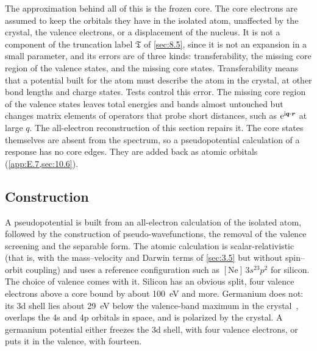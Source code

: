 The approximation behind all of this is the frozen core. The core electrons are assumed to keep the orbitals they have in the isolated atom, unaffected by the crystal, the valence electrons, or a displacement of the nucleus. It is not a component of the truncation label $\mathfrak{T}$ of \cref{sec:8.5}, since it is not an expansion in a small parameter, and its errors are of three kinds: transferability, the missing core region of the valence states, and the missing core states. Transferability means that a potential built for the atom must describe the atom in the crystal, at other bond lengths and charge states. Tests control this error. The missing core region of the valence states leaves total energies and bands almost untouched but changes matrix elements of operators that probe short distances, such as $\mathrm{e}^{\mathrm{i}\bm{q}\cdot\bm{r}}$ at large $q$. The all-electron reconstruction of this section repairs it. The core states themselves are absent from the spectrum, so a pseudopotential calculation of a response has no core edges. They are added back as atomic orbitals (\cref{app:E.7,sec:10.6}).

\subsection{Construction}

A pseudopotential is built from an all-electron calculation of the isolated atom, followed by the construction of pseudo-wavefunctions, the removal of the valence screening and the separable form. The atomic calculation is scalar-relativistic (that is, with the mass--velocity and Darwin terms of \cref{sec:3.5} but without spin--orbit coupling) and uses a reference configuration such as $[\mathrm{Ne}]\,3s^23p^2$ for silicon. The choice of valence comes with it. Silicon has an obvious split, four valence electrons above a core bound by about \SI{100}{eV} and more. Germanium does not: its 3d shell lies about \SI{29}{eV} below the valence-band maximum in the crystal~\cite[Table~1-1]{williams2009electron}, overlaps the 4s and 4p orbitals in space, and is polarized by the crystal. A germanium potential either freezes the 3d shell, with four valence electrons, or puts it in the valence, with fourteen.

